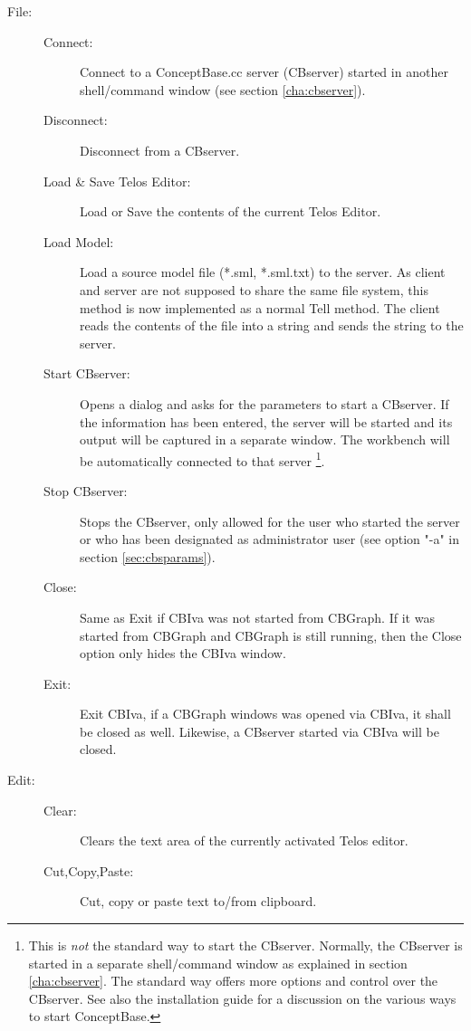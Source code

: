 \begin{description}
\item[File:]
	\begin{description}
	\item[Connect:] Connect to a ConceptBase.cc server (CBserver) started in another shell/command window (see section \ref{cha:cbserver}).
	\item[Disconnect:] Disconnect from a CBserver.
	\item[Load \& Save Telos Editor:] Load or Save the contents of the current
	Telos Editor.
	\item[Load Model:] Load a source model file (*.sml, *.sml.txt) to the server. As client and server are not supposed
	to share the same file system, this method is now implemented as a normal Tell method. The client
	reads the contents of the file into a string and sends the string to the server.
	\item[Start CBserver:] Opens a dialog and asks for the parameters to start a CBserver.
	If the information has been entered, the server will be started
	and its output will be captured in a separate window. The workbench will
	be automatically connected to that server%
\footnote{This is {\em not\/} the standard way to start the CBserver. Normally, the CBserver
is started in a separate shell/command window as explained in section \ref{cha:cbserver}. The standard
way offers more options and control over the CBserver. See also the installation guide for
a discussion on the various ways to start ConceptBase.}.
	\item[Stop CBserver:] Stops the CBserver, only allowed for the user who started the server
         or who has been designated as administrator user (see option "-a" in section \ref{sec:cbsparams}).
	\item[Close:] Same as Exit if CBIva was not started from CBGraph. If it was started from CBGraph
        and CBGraph is still running, then the Close option only hides the CBIva window.
	\item[Exit:] Exit CBIva, if a CBGraph windows was opened via CBIva, it shall be closed as
        well. Likewise, a CBserver started via CBIva will be closed.
	\end{description}
\item[Edit:]
	\begin{description}
	\item[Clear:] Clears the text area of the currently activated Telos editor.
	\item[Cut,Copy,Paste:] Cut, copy or paste text to/from clipboard.

\end{description}
\end{description}
